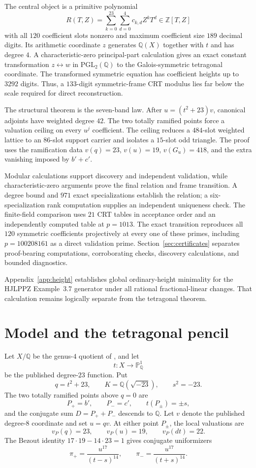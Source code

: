 \documentclass[11pt]{article}
\newcommand{\Q}{\mathbb Q}
\newcommand{\PP}{\mathbb P}
\begin{document}
The central object is a primitive polynomial
\[
R(T,Z)=\sum_{k=0}^{23}\sum_{d=0}^{4}c_{k,d}Z^kT^d\in\mathbb Z[T,Z]
\]
with all $120$ coefficient slots nonzero and maximum coefficient size $189$ decimal digits.  Its arithmetic coordinate $z$ generates $\Q(X)$ together with $t$ and has degree $4$.  A characteristic-zero principal-part calculation gives an exact constant transformation $z\leftrightarrow w$ in $\mathrm{PGL}_2(\Q)$ to the Galois-symmetric tetragonal coordinate.  The transformed symmetric equation has coefficient heights up to $3292$ digits.  Thus, a $133$-digit symmetric-frame CRT modulus lies far below the scale required for direct reconstruction.

The structural theorem is the seven-band law.  After $u=(t^2+23)v$, canonical adjoints have weighted degree $42$.  The two totally ramified points force a valuation ceiling on every $u^j$ coefficient.  The ceiling reduces a $484$-slot weighted lattice to an $86$-slot support carrier and isolates a $15$-slot odd triangle.  The proof uses the ramification data $v(q)=23$, $v(u)=19$, $v(G_u)=418$, and the extra vanishing imposed by $b'+c'$.

Modular calculations support discovery and independent validation, while characteristic-zero arguments prove the final relation and frame transition.  A degree bound and $971$ exact specializations establish the relation; a six-specialization rank computation supplies an independent uniqueness check.  The finite-field comparison uses $21$ CRT tables in acceptance order and an independently computed table at $p=1013$.  The exact transition reproduces all $120$ symmetric coefficients projectively at every one of these primes, including $p=100208161$ as a direct validation prime.  Section~\ref{sec:certificates} separates proof-bearing computations, corroborating checks, discovery calculations, and bounded diagnostics.

Appendix~\ref{app:height} establishes global ordinary-height minimality for the HJLPPZ Example~3.7 generator under all rational fractional-linear changes.  That calculation remains logically separate from the tetragonal theorem.
\section{Model and the tetragonal pencil}\label{sec:model}
Let $X/\Q$ be the genus-$4$ quotient of \cite{HJLPPZ2026}, and let
\[
t:X\longrightarrow\PP^1_\Q
\]
be the published degree-$23$ function.  Put
\[
q=t^2+23,\qquad K=\Q(\sqrt{-23}),\qquad s^2=-23.
\]
The two totally ramified points above $q=0$ are
\[
P_+=b',\qquad P_-=c',\qquad t(P_\pm)=\pm s,
\]
and the conjugate sum $D=P_++P_-$ descends to $\Q$.  Let $v$ denote the published degree-$8$ coordinate and set $u=qv$.  At either point $P_\pm$, the local valuations are
\[
v_P(q)=23,\qquad v_P(u)=19,\qquad v_P(dt)=22.
\]
The Bezout identity $17\cdot19-14\cdot23=1$ gives conjugate uniformizers
\[
\pi_+=\frac{u^{17}}{(t-s)^{14}},\qquad
\pi_-=\frac{u^{17}}{(t+s)^{14}}.
\]
\end{document}
